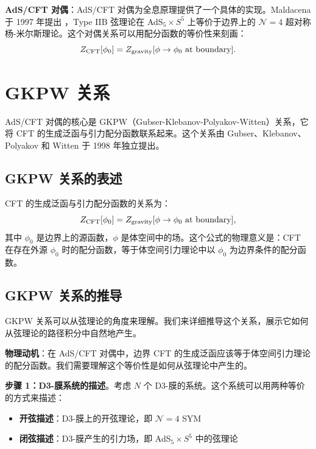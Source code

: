 \textbf{AdS/CFT 对偶}：AdS/CFT 对偶为全息原理提供了一个具体的实现。Maldacena 于 1997 年提出 \cite{Maldacena1997}，Type IIB 弦理论在 AdS$_5 \times S^5$ 上等价于边界上的 $\mathcal{N}=4$ 超对称杨-米尔斯理论。这个对偶关系可以用配分函数的等价性来刻画：
\begin{equation}
    Z_{\rm CFT}[\phi_0] = Z_{\rm gravity}[\phi \to \phi_0 \text{ at boundary}].
\end{equation}

\section{GKPW 关系}

AdS/CFT 对偶的核心是 GKPW（Gubser-Klebanov-Polyakov-Witten）关系，它将 CFT 的生成泛函与引力配分函数联系起来。这个关系由 Gubser、Klebanov、Polyakov \cite{Gubser1998} 和 Witten \cite{Witten1998} 于 1998 年独立提出。

\subsection{GKPW 关系的表述}

\begin{theorem}
CFT 的生成泛函与引力配分函数的关系为：
\begin{equation}
    Z_{\rm CFT}[\phi_0] = Z_{\rm gravity}[\phi \to \phi_0 \text{ at boundary}],
\end{equation}
其中 $\phi_0$ 是边界上的源函数，$\phi$ 是体空间中的场。这个公式的物理意义是：CFT 在存在外源 $\phi_0$ 时的配分函数，等于体空间引力理论中以 $\phi_0$ 为边界条件的配分函数。
\end{theorem}

\subsection{GKPW 关系的推导}

GKPW 关系可以从弦理论的角度来理解。我们来详细推导这个关系，展示它如何从弦理论的路径积分中自然地产生。

\textbf{物理动机}：在 AdS/CFT 对偶中，边界 CFT 的生成泛函应该等于体空间引力理论的配分函数。我们需要理解这个等价性是如何从弦理论中产生的。

\textbf{步骤 1：D3-膜系统的描述}。考虑 $N$ 个 D3-膜的系统。这个系统可以用两种等价的方式来描述：
\begin{itemize}
    \item \textbf{开弦描述}：D3-膜上的开弦理论，即 $\mathcal{N}=4$ SYM
    \item \textbf{闭弦描述}：D3-膜产生的引力场，即 AdS$_5 \times S^5$ 中的弦理论
\end{itemize}

